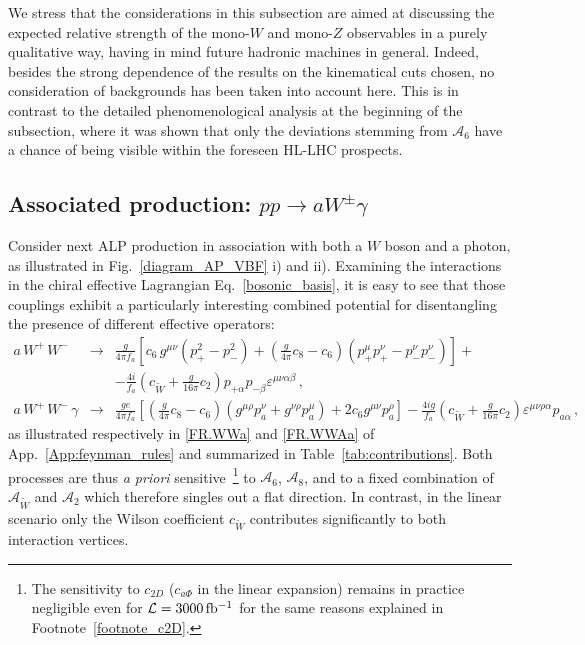 \documentclass[11pt]{article}
\renewcommand{\a}{\alpha}
\renewcommand{\b}{\beta}
\newcommand{\m}{\mu}
\renewcommand{\r}{\rho}
\newcommand{\e}{\varepsilon}
\renewcommand{\m}{\mu}
\newcommand{\n}{\nu}
\newcommand{\A}{\mathcal{A}}
\newcommand{\Wt}{{\tilde{W}}}
\renewcommand{\to}{\rightarrow}
\renewcommand{\[}{\begin{equation}}
\renewcommand{\]}{\end{equation}}
\newcounter{diagram}
\begin{document}
We stress that the considerations in this subsection are aimed at discussing the expected relative strength of the mono-$W$ and mono-$Z$ observables in a purely 
qualitative way, having in mind future hadronic machines in general. Indeed, besides the strong dependence of the results on the kinematical cuts chosen, no 
consideration of backgrounds has been taken into account here. This is in contrast to the detailed phenomenological analysis at the 
beginning of the subsection, where it was shown that  only the deviations stemming from   $\A_{6}$ have a chance of being visible within the foreseen HL-LHC prospects. 

\subsection[Associated production: $pp\to a W^\pm \gamma$]{Associated production: $pp\to a W^\pm \gamma$} 
\label{Sect:AP_gamma}
%
Consider next ALP production in association with both a $W$ boson and a photon, as illustrated in Fig.~\ref{diagram_AP_VBF} i) and ii). Examining  the 
interactions in the chiral effective Lagrangian Eq.~\eqref{bosonic_basis}, it is easy to see that those  
couplings exhibit  a particularly interesting combined potential for disentangling the presence of different effective operators: 
%
\begin{eqnarray}
\label{aWW_aWWgamma}
a\, W^{+}\, W^{-}  &\rightarrow & \frac{g}{4\pi f_a}\left[c_6\,g^{\mu\nu}(p_+^2-p_-^2)+
\left(\frac{g}{4\pi}c_8-c_6\right)\left(p_+^\mu p_+^\nu -p_-^\nu p_-^\nu\right)\right]+
\nonumber \\ 
& & -\frac{4i}{f_a}\left(c_{\tilde{W}}+\frac{g}{16\pi}c_2\right)p_{+\a}p_{-\b}\e^{\mu\nu\a\b}\,,
\label{eq_APVBFcoupl} \\
a\, W^{+}\, W^{-}\, \gamma & \rightarrow& \frac{ge}{4\pi f_a}\left[\left(\frac{g}{4\pi}c_8-c_6\right)(g^{\m\r}p_a^\n+g^{\n\r}p_a^\m)
+2c_6g^{\mu\nu}p_a^\rho\right]-\frac{4ig}{f_a}\left(c_\Wt +\frac{g}{16\pi}c_2\right)\e^{\m\n\r\a}p_{a\a}\,, \nonumber
\end{eqnarray}
%
as illustrated respectively in  \ref{FR.WWa} and \ref{FR.WWAa} of App.~\ref{App:feynman_rules} and summarized in  Table~\ref{tab:contributions}. 
Both processes are thus {\it a priori} sensitive~\footnote{The sensitivity to $c_{2D}$ ($c_{a\Phi}$ in the linear expansion) remains in 
practice negligible even for $\mathcal{L}=\unit[3000]{fb^{-1}}$ for the same reasons explained in Footnote~\ref{footnote_c2D}. }
 to  $\A_6$, $\A_8$, and to a fixed combination of $\A_{\tilde{W}}$ and $\A_2$ which therefore singles out  a flat direction.  In contrast, in the linear scenario only the Wilson coefficient $c_\Wt$ contributes significantly to both interaction vertices. 
\end{document}
